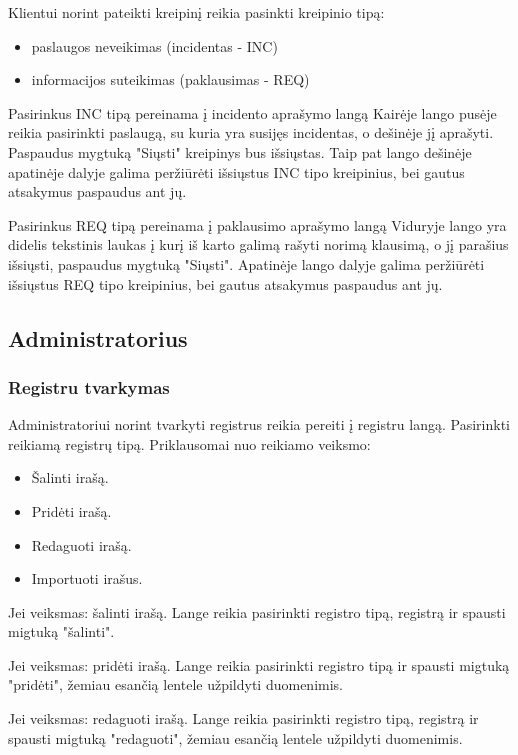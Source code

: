 	Klientui norint pateikti kreipinį reikia pasinkti kreipinio tipą:
	
	\begin{itemize}
		\item paslaugos neveikimas (incidentas - INC)
		\item informacijos suteikimas (paklausimas - REQ)
	\end{itemize}
	
	
	Pasirinkus INC tipą pereinama į incidento aprašymo langą 
	Kairėje lango pusėje reikia pasirinkti paslaugą, su kuria yra susijęs incidentas, o dešinėje jį aprašyti.
	Paspaudus mygtuką "Siųsti" kreipinys bus išsiųstas.
	Taip pat lango dešinėje apatinėje dalyje galima peržiūrėti išsiųstus INC tipo kreipinius, bei gautus atsakymus paspaudus ant jų.
	

	Pasirinkus REQ tipą pereinama į paklausimo aprašymo langą 
	Viduryje lango yra didelis tekstinis laukas į kurį iš karto galimą rašyti norimą klausimą, o jį parašius išsiųsti, paspaudus mygtuką "Siųsti".
	Apatinėje lango dalyje galima peržiūrėti išsiųstus REQ tipo kreipinius, bei gautus atsakymus paspaudus ant jų.
	
\subsection{Administratorius}

	\subsubsection{Registru tvarkymas}
	
	Administratoriui norint tvarkyti registrus reikia pereiti į registru langą. Pasirinkti reikiamą registrų tipą. 
	Priklausomai nuo reikiamo veiksmo:
	
	\begin{itemize}
		\item Šalinti irašą.
		\item Pridėti irašą.
		\item Redaguoti irašą.
		\item Importuoti irašus.
	\end{itemize}
	
	
	Jei veiksmas: šalinti irašą. Lange  reikia pasirinkti registro tipą, registrą ir spausti migtuką "šalinti".

	Jei veiksmas: pridėti irašą. Lange  reikia pasirinkti registro tipą ir spausti migtuką "pridėti", žemiau esančią lentele užpildyti duomenimis.

	Jei veiksmas: redaguoti irašą. Lange  reikia pasirinkti registro tipą, registrą ir spausti migtuką "redaguoti", žemiau esančią lentele užpildyti duomenimis.

